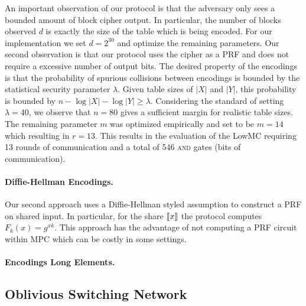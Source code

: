 An important observation of our protocol is that the adversary only sees a bounded amount of block cipher output. In particular, the number of blocks observed $d$ is exactly the size of the table which is being encoded. For our implementation we set $d=2^{30}$ and optimize the remaining parameters. Our second observation is that our protocol uses the cipher as a PRF and does not require a excessive number of output bits. The desired property of the encodings is that the probability of spurious collisions between encodings is bounded by the statistical security parameter $\lambda$. Given table sizes of $|X|$ and $|Y|$, this probability is bounded by $n-\log |X|-\log |Y|\geq \lambda$. Considering the standard of setting $\lambda=40$, we observe that $n=80$ gives a sufficient margin for realistic table sizes. The remaining parameter $m$ was optimized empirically and set to be $m=14$ which resulting in $r=13$. This results in the evaluation of the LowMC requiring 13 rounds of communication and a total of 546 \textsc{and} gates (bits of communication).



\paragraph{Diffie-Hellman Encodings.} Our second approach uses a Diffie-Hellman styled assumption to construct a PRF on shared input. In particular, for the share $\llbracket x\rrbracket$ the protocol computes $F_k(x) = g^{xk}$. This approach has the advantage of not computing a PRF circuit within MPC which can be costly in some settings.




\paragraph{Encodings Long Elements.}

\subsection{Oblivious Switching Network}

